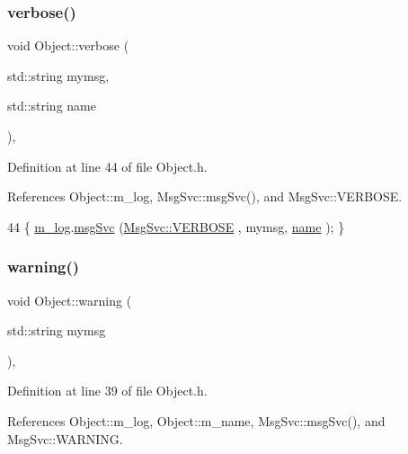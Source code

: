 \subsubsection{\texorpdfstring{verbose()}{verbose()}\hspace{0.1cm}{\footnotesize\ttfamily [2/2]}}
{\footnotesize\ttfamily void Object\+::verbose (\begin{DoxyParamCaption}\item[{std\+::string}]{mymsg,  }\item[{std\+::string}]{name }\end{DoxyParamCaption})\hspace{0.3cm}{\ttfamily [inline]}, {\ttfamily [inherited]}}



Definition at line 44 of file Object.\+h.



References Object\+::m\+\_\+log, Msg\+Svc\+::msg\+Svc(), and Msg\+Svc\+::\+V\+E\+R\+B\+O\+SE.


\begin{DoxyCode}
44 \{ \hyperlink{classObject_a0d269813dd7ac1f24bc143031e2963f2}{m\_log}.\hyperlink{classMsgSvc_ad25f18047920cc59a314e5098259711c}{msgSvc} (\hyperlink{classMsgSvc_ae671eb7301996cd049d2da8a65925926af655256b06494ade5ba830abe5401ec9}{MsgSvc::VERBOSE} , mymsg, \hyperlink{classObject_a300f4c05dd468c7bb8b3c968868443c1}{name} ); \}
\end{DoxyCode}
\mbox{\label{classObject_a65cd4fda577711660821fd2cd5a3b4c9}} 
\subsubsection{\texorpdfstring{warning()}{warning()}\hspace{0.1cm}{\footnotesize\ttfamily [1/2]}}
{\footnotesize\ttfamily void Object\+::warning (\begin{DoxyParamCaption}\item[{std\+::string}]{mymsg }\end{DoxyParamCaption})\hspace{0.3cm}{\ttfamily [inline]}, {\ttfamily [inherited]}}



Definition at line 39 of file Object.\+h.



References Object\+::m\+\_\+log, Object\+::m\+\_\+name, Msg\+Svc\+::msg\+Svc(), and Msg\+Svc\+::\+W\+A\+R\+N\+I\+NG.



